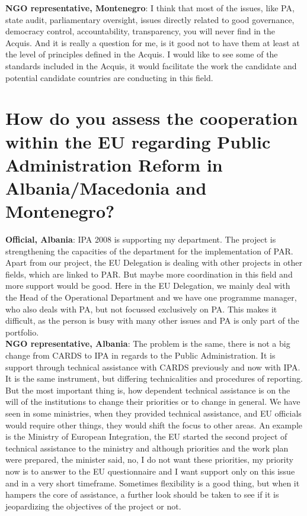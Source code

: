 \textbf{NGO representative, Montenegro}: I think that most of the issues, like PA, state audit, parliamentary oversight, issues directly related to good governance, democracy control, accountability, transparency, you will never find in the Acquis. And it is really a question for me, is it good not to have them at least at the level of principles defined in the Acquis. I would like to see some of the standards included in the Acquis, it would facilitate the work the candidate and potential candidate countries are conducting in this field.%
\section{How do you assess the cooperation within the EU regarding Public Administration Reform in Albania/Macedonia and Montenegro?}
\textbf{Official, Albania}: IPA 2008 is supporting my department. The project is strengthening the capacities of the department for the implementation of PAR. Apart from our project, the EU Delegation is dealing with other projects in other fields, which are linked to PAR. But maybe more coordination in this field and more support would be good. Here in the EU Delegation, we mainly deal with the Head of the Operational Department and we have one programme manager, who also deals with PA, but not focussed exclusively on PA. This makes it difficult, as the person is busy with many other issues and PA is only part of the portfolio. \\
\textbf{NGO representative, Albania}: The problem is the same, there is not a big change from CARDS to IPA in regards to the Public Administration. It is support through technical assistance with CARDS previously and now with IPA. It is the same instrument, but differing technicalities and procedures of reporting. But the most important thing is, how dependent technical assistance is on the will of the institutions to change their priorities or to change in general. We have seen in some ministries, when they provided technical assistance, and EU officials would require other things, they would shift the focus to other areas. An example is the Ministry of European Integration, the EU started the second project of technical assistance to the ministry and although priorities and the work plan were prepared, the minister said, no, I do not want these priorities, my priority now is to answer to the EU questionnaire and I want support only on this issue and in a very short timeframe. Sometimes flexibility is a good thing, but when it hampers the core of assistance, a further look should be taken to see if it is jeopardizing the objectives of the project or not.  \\
